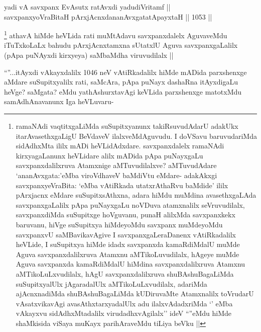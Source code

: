 
\begin{shl}
yadi vA savxpanx EvAsutx ratAvxdi yadudiVritamf || \\
savxpanxyoVraBitaH pArxjAcnxdananAvxgatatA\s payxtaH ||  1053 ||  
\end{shl}

\begin{artha}
\footnote{ramaNAdi vaqtitxgaLiMda suSupitxyanunx takiRsuvudAdarU adakUkx itarAvasethxgaLigU BeVdaveV ilalxveMdAguvudu. I doVSavu baruvudariMda sidAdhxMta ililx mADi heVLidAdxdare. savxpanxdalelx ramaNAdi kirxyagaLanunx heVLidare alilx mADida pApa puNayxgaLu savxpanxdalilxruva Atamxnige aMTuvudilalxve? aMTuvudAdare `ananAvxgata:'eMba viroVdhaveV baMdiVtu eMdare- adakAkxgi savxpanxyeVraBita: `eMba vAtiRkada utatxrAthaRvu baMdide' ililx pArxjacnx eMdare suSupitxsAthxna, adara hiMdu muMdina avasethxgaLAda savxpanxgaLalilx pApa puNayxgaLu noVDuva atamxnalilx seVruvudilalx, savxpanxdiMda suSupitxge hoVguvanu, punaH alilxMda savxpanxkekx baruvanu, hiVge suSupitxya hiMdeyoMdu savxpanx muMdeyoMdu savxpanxvU saMBavikavAgive I savxpanxgaLeraDanenx vAtiRkadalilx heVLide, I suSupitxya hiMde idadx savxpanxda kamaRdiMdalU muMde Aguva savxpanxdalilxruva Atamxnu aMTikoLuvudilalx, hAgeye muMde Aguva savxpanxda kamaRdiMdalU hiMdina savxpanxdalilxruva Atamxnu aMTikoLuLxvudilalx, hAgU savxpanxdalilxruva shuBAshuBagaLiMda suSupitxyalUlx jAgaradalUlx aMTikoLuLxvudilalx, adariMda ajAcnxnadiMda shuBAshuBagaLiMda kUDiruvaMte Atamxnalilx toVrudarU vAsatxvikavAgi avasAthxtarxyadalUlx adu ilalxvAdadxriMda `\stext' eMba vAkayxvu sidAdhxMtadalilx virudadhxvAgilalx'' ideV ``\stext''eMdu hiMde shaMkisida viSaya muKayx parihAraveMdu tiLiya beVku ||}
athavA hiMde heVLida rati muMtAdavu savxpanxdalelx AguvaveMdu iTuTxkoLaLx bahudu pArxjAcnxtamxna sUtatxlU Aguva savxpanxgaLalilx (pApa puNAyxdi kirxyeya) saMbaMdha viruvudilalx ||
\end{artha}

\begin{artha}
``\stext''...itAyxdi vAkayxdalilx 1046 neV vAtiRkadalilx hiMde mADida parxshenxge aMdare suSupitxyalilx rati, saMcAra, pApa puNayx dashaRna itAyxdigaLu heVge? saMgata? eMdu yathAshurxtavAgi keVLida parxshenxge matotxMdu samAdhAnavanunx Iga heVLuvaru-
\end{artha}


